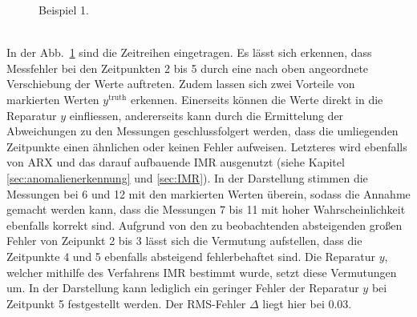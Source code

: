 \begin{figure}
    \caption{Beispiel 1.}\label{fig:1}
\end{figure}
~\\
In der Abb.\ \ref{fig:1} sind die Zeitreihen eingetragen. Es lässt sich
erkennen, dass Messfehler bei den Zeitpunkten 2 bis 5 durch eine nach oben
angeordnete Verschiebung der Werte auftreten.  Zudem lassen sich zwei Vorteile
von markierten Werten $y^{\text{truth}}$ erkennen.  Einerseits können die Werte
direkt in die Reparatur $y$ einfliessen, andererseits kann durch die
Ermittelung der Abweichungen zu den Messungen geschlussfolgert werden, dass die
umliegenden Zeitpunkte einen ähnlichen oder keinen Fehler aufweisen.  Letzteres
wird ebenfalls von ARX und das darauf aufbauende IMR ausgenutzt (siehe Kapitel
\ref{sec:anomalienerkennung} und \ref{sec:IMR}). In der Darstellung stimmen die
Messungen bei 6 und 12 mit den markierten Werten überein, sodass die Annahme
gemacht werden kann, dass die Messungen 7 bis 11 mit hoher Wahrscheinlichkeit
ebenfalls korrekt sind.  Aufgrund von den zu beobachtenden absteigenden großen
Fehler von Zeipunkt 2 bis 3 lässt sich die Vermutung aufstellen, dass die
Zeitpunkte 4 und 5 ebenfalls absteigend fehlerbehaftet sind. Die Reparatur $y$,
welcher mithilfe des Verfahrens IMR bestimmt wurde, setzt diese Vermutungen um.
In der Darstellung kann lediglich ein geringer Fehler der Reparatur $y$ bei
Zeitpunkt 5 festgestellt werden. Der RMS-Fehler $\Delta$ liegt hier bei $0.03$.   

